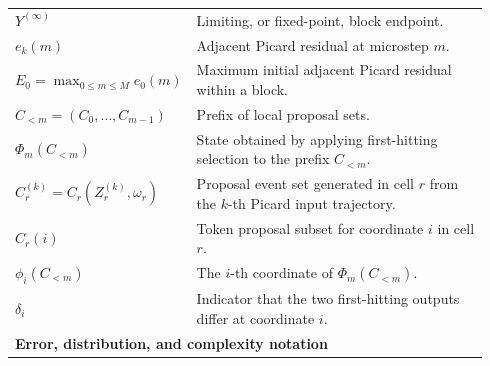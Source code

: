 \documentclass{article}
\begin{document}
\begin{longtable}{p{0.28\linewidth}p{0.66\linewidth}}
\(Y^{(\infty)}\) & Limiting, or fixed-point, block endpoint. \\
\(e_k(m)\) & Adjacent Picard residual at microstep \(m\). \\
\(E_0=\max_{0\le m\le M}e_0(m)\) & Maximum initial adjacent Picard residual within a block. \\
\(C_{<m}=(C_0,\ldots,C_{m-1})\) & Prefix of local proposal sets. \\
\(\Phi_m(C_{<m})\) & State obtained by applying first-hitting selection to the prefix \(C_{<m}\). \\
\(C_r^{(k)}=C_r(Z_r^{(k)},\omega_r)\) & Proposal event set generated in cell \(r\) from the \(k\)-th Picard input trajectory. \\
\(C_r(i)\) & Token proposal subset for coordinate \(i\) in cell \(r\). \\
\(\phi_i(C_{<m})\) & The \(i\)-th coordinate of \(\Phi_m(C_{<m})\). \\
\(\delta_i\) & Indicator that the two first-hitting outputs differ at coordinate \(i\). \\

\midrule
\multicolumn{2}{l}{\textbf{Error, distribution, and complexity notation}}\\
\midrule


\end{longtable}
\end{document}
